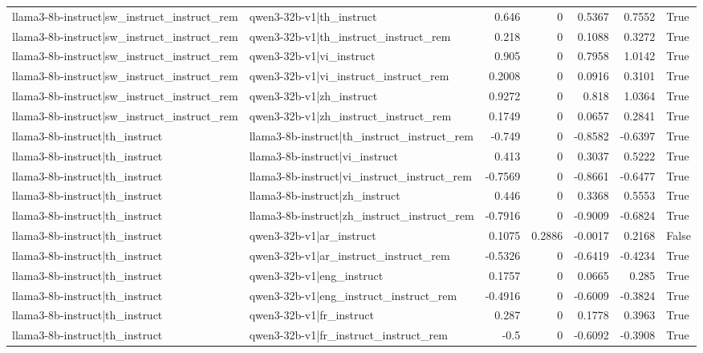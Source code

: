 \begin{table}
\begin{tabular}{l l r r r r l}
llama3-8b-instruct|sw_instruct_instruct_rem & qwen3-32b-v1|th_instruct & 0.646 & 0 & 0.5367 & 0.7552 & True \\
llama3-8b-instruct|sw_instruct_instruct_rem & qwen3-32b-v1|th_instruct_instruct_rem & 0.218 & 0 & 0.1088 & 0.3272 & True \\
llama3-8b-instruct|sw_instruct_instruct_rem & qwen3-32b-v1|vi_instruct & 0.905 & 0 & 0.7958 & 1.0142 & True \\
llama3-8b-instruct|sw_instruct_instruct_rem & qwen3-32b-v1|vi_instruct_instruct_rem & 0.2008 & 0 & 0.0916 & 0.3101 & True \\
llama3-8b-instruct|sw_instruct_instruct_rem & qwen3-32b-v1|zh_instruct & 0.9272 & 0 & 0.818 & 1.0364 & True \\
llama3-8b-instruct|sw_instruct_instruct_rem & qwen3-32b-v1|zh_instruct_instruct_rem & 0.1749 & 0 & 0.0657 & 0.2841 & True \\
llama3-8b-instruct|th_instruct & llama3-8b-instruct|th_instruct_instruct_rem & -0.749 & 0 & -0.8582 & -0.6397 & True \\
llama3-8b-instruct|th_instruct & llama3-8b-instruct|vi_instruct & 0.413 & 0 & 0.3037 & 0.5222 & True \\
llama3-8b-instruct|th_instruct & llama3-8b-instruct|vi_instruct_instruct_rem & -0.7569 & 0 & -0.8661 & -0.6477 & True \\
llama3-8b-instruct|th_instruct & llama3-8b-instruct|zh_instruct & 0.446 & 0 & 0.3368 & 0.5553 & True \\
llama3-8b-instruct|th_instruct & llama3-8b-instruct|zh_instruct_instruct_rem & -0.7916 & 0 & -0.9009 & -0.6824 & True \\
llama3-8b-instruct|th_instruct & qwen3-32b-v1|ar_instruct & 0.1075 & 0.2886 & -0.0017 & 0.2168 & False \\
llama3-8b-instruct|th_instruct & qwen3-32b-v1|ar_instruct_instruct_rem & -0.5326 & 0 & -0.6419 & -0.4234 & True \\
llama3-8b-instruct|th_instruct & qwen3-32b-v1|eng_instruct & 0.1757 & 0 & 0.0665 & 0.285 & True \\
llama3-8b-instruct|th_instruct & qwen3-32b-v1|eng_instruct_instruct_rem & -0.4916 & 0 & -0.6009 & -0.3824 & True \\
llama3-8b-instruct|th_instruct & qwen3-32b-v1|fr_instruct & 0.287 & 0 & 0.1778 & 0.3963 & True \\
llama3-8b-instruct|th_instruct & qwen3-32b-v1|fr_instruct_instruct_rem & -0.5 & 0 & -0.6092 & -0.3908 & True \\

\end{tabular}
\end{table}
